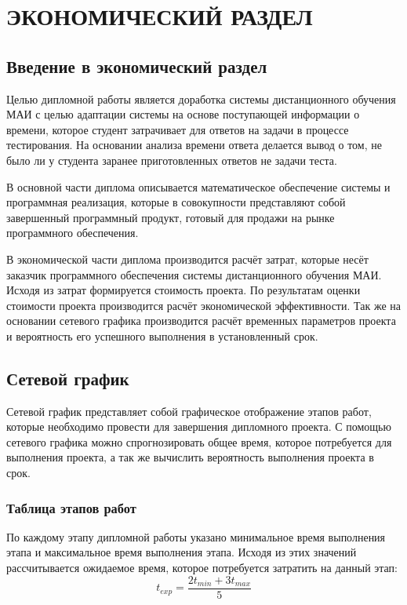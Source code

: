  \chapter{ЭКОНОМИЧЕСКИЙ РАЗДЕЛ}
 \setcounter{page}{32}
\newpage

 \section{Введение в экономический раздел}

Целью дипломной работы является доработка системы дистанционного обучения МАИ с целью адаптации системы на основе поступающей инфор\-мации о времени, которое студент затрачивает для ответов на задачи в про\-цессе тестирования. На основании анализа времени ответа делается вывод о том, не было ли у студента заранее приготовленных ответов не задачи теста.

В основной части диплома описывается математическое обеспечение сис\-темы и программная реализация, которые в совокупности представляют со\-бой завершенный программный продукт, готовый для продажи на рынке программного обеспечения.

В экономической части диплома производится расчёт затрат, которые несёт заказчик программного обеспечения системы дистанционного обучения МАИ. Исходя из затрат формируется стоимость проекта. По результатам оценки стоимости проекта производится расчёт экономической эффективно\-сти. Так же на основании сетевого графика производится расчёт временных па\-раметров проекта и вероятность его успешного выполнения в установлен\-ный срок.

\section{Сетевой график}

Сетевой график представляет собой графическое отображение этапов ра\-бот, которые необходимо провести для завершения дипломного проекта. С помощью сетевого графика можно спрогнозировать общее время, которое потребуется для выполнения проекта, а так же вычислить вероятность вы\-полнения проекта в срок.

\subsection{Таблица этапов работ}
По каждому этапу дипломной работы указано минимальное время выпол\-нения этапа и максимальное время выпол\-нения этапа. Исходя из этих зна\-чений рассчитывается ожидаемое время, которое потребуется затратить на данный этап:
$$
t_{exp} = \frac{2t_{min}+3t_{max}}{5}
$$

